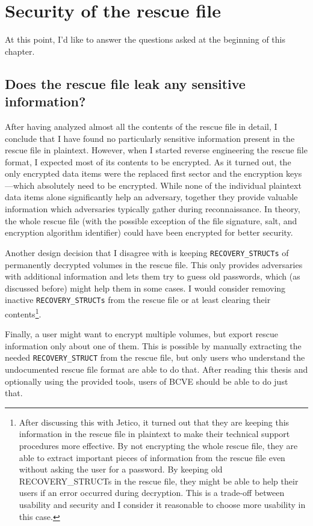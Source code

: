 \documentclass[thesis=B,english]{FITthesis}[2012/10/20]
\begin{document}
	\section{Security of the rescue file}
	
	At this point, I'd like to answer the questions asked at the beginning of this chapter.
	
	\subsection{Does the rescue file leak any sensitive information?}
	
	After having analyzed almost all the contents of the rescue file in detail, I conclude that I have found no particularly sensitive information present in the rescue file in plaintext. However, when I started reverse engineering the rescue file format, I expected most of its contents to be encrypted. As it turned out, the only encrypted data items were the replaced first sector and the encryption keys---which absolutely need to be encrypted. While none of the individual plaintext data items alone significantly help an adversary, together they provide valuable information which adversaries typically gather during reconnaissance. In theory, the whole rescue file (with the possible exception of the file signature, salt, and encryption algorithm identifier) could have been encrypted for better security. 
	
	Another design decision that I disagree with is keeping \verb|RECOVERY_STRUCTs| of permanently decrypted volumes in the rescue file. This only provides adversaries with additional information and lets them try to guess old passwords, which (as discussed before) might help them in some cases. I would consider removing inactive \verb|RECOVERY_STRUCTs| from the rescue file or at least clearing their contents\footnote{After discussing this with Jetico, it turned out that they are keeping this information in the rescue file in plaintext to make their technical support procedures more effective. By not encrypting the whole rescue file, they are able to extract important pieces of information from the rescue file even without asking the user for a password. By keeping old RECOVERY\_STRUCTs in the rescue file, they might be able to help their users if an error occurred during decryption. This is a trade-off between usability and security and I consider it reasonable to choose more usability in this case. }. 
	
	Finally, a user might want to encrypt multiple volumes, but export rescue information only about one of them. This is possible by manually extracting the needed \verb|RECOVERY_STRUCT| from the rescue file, but only users who understand the undocumented rescue file format are able to do that. After reading this thesis and optionally using the provided tools, users of BCVE should be able to do just that. 
	
\end{document}
